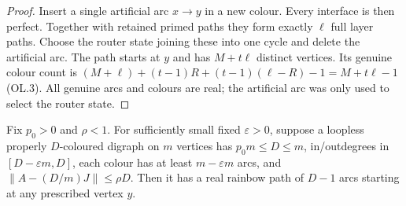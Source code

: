 \begin{proof}
Insert a single artificial arc $x\to{}y$ in a new colour. Every interface is then perfect. Together with retained primed paths they
form exactly $\ell$ full layer paths. Choose the router state joining these into one cycle and delete the artificial arc. The path starts
at $y$ and has $M+t\ell$ distinct vertices. Its genuine colour count is $(M+\ell)+(t-1)R+(t-1)(\ell-R)-1=M+t\ell-1$ \textup{(OL.3)}. All genuine arcs and colours are real; the artificial arc was only
used to select the router state.
\end{proof}

\begin{lemma}\label{rou:oneblock}
Fix $p_0>0$ and $\rho<1$. For sufficiently small fixed $\varepsilon>0$, suppose a loopless properly $D$-coloured digraph on $m$ vertices has $p_0m\le{}D\le{}m$, in/outdegrees in $[D-\varepsilon{}m,D]$, each colour has at least $m-\varepsilon{}m$ arcs, and $\|A-(D/m)J\|\le\rho{}D$. Then it has a real rainbow path of $D-1$ arcs starting at any prescribed vertex $y$.
\end{lemma}
